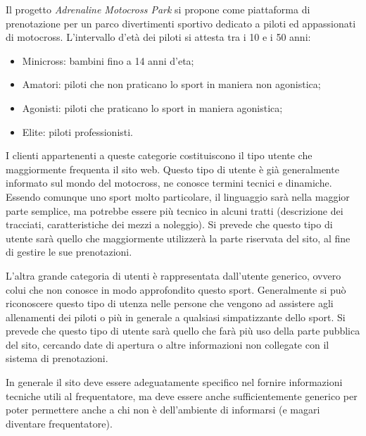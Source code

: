 Il progetto \textit{Adrenaline Motocross Park} si propone come piattaforma di prenotazione per un parco divertimenti sportivo dedicato a piloti ed appassionati di motocross. L'intervallo d'età dei piloti si attesta tra i 10 e i 50 anni:
\begin{itemize}
\item Minicross: bambini fino a 14 anni d'eta;
\item Amatori: piloti che non praticano lo sport in maniera non agonistica;
\item Agonisti: piloti che praticano lo sport in maniera agonistica;
\item Elite: piloti professionisti.
\end{itemize} 

I clienti appartenenti a queste categorie costituiscono il tipo utente che maggiormente frequenta il sito web. Questo tipo di utente è già generalmente informato sul mondo del motocross, ne conosce termini tecnici e dinamiche.
Essendo comunque uno sport molto particolare, il linguaggio sarà nella maggior parte semplice, ma potrebbe essere più tecnico in alcuni tratti (descrizione dei tracciati, caratteristiche dei mezzi a noleggio). Si prevede che questo tipo di utente sarà quello che maggiormente utilizzerà la parte riservata del sito,  al fine di gestire le sue prenotazioni.

L'altra grande categoria di utenti è rappresentata dall'utente generico, ovvero colui che non conosce in modo approfondito questo sport. Generalmente si può riconoscere questo tipo di utenza nelle persone che vengono ad assistere agli allenamenti dei piloti o più in generale a qualsiasi simpatizzante dello sport. Si prevede che questo tipo di utente sarà quello che farà più uso della parte pubblica del sito, cercando date di apertura o altre informazioni non collegate con il sistema di prenotazioni.

In generale il sito deve essere adeguatamente specifico nel fornire informazioni tecniche utili al frequentatore, ma deve essere anche sufficientemente generico per poter permettere anche a chi non è dell'ambiente di informarsi (e magari diventare frequentatore).